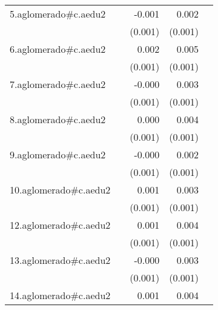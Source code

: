 {\begin{longtable}{l*{4}{D{.}{.}{-1}}}
\addlinespace
5.aglomerado#c.aedu2&                     &      -0.001         &       0.002\sym{**} &                     \\
            &                     &     (0.001)         &     (0.001)         &                     \\
\addlinespace
6.aglomerado#c.aedu2&                     &       0.002         &       0.005\sym{***}&                     \\
            &                     &     (0.001)         &     (0.001)         &                     \\
\addlinespace
7.aglomerado#c.aedu2&                     &      -0.000         &       0.003\sym{**} &                     \\
            &                     &     (0.001)         &     (0.001)         &                     \\
\addlinespace
8.aglomerado#c.aedu2&                     &       0.000         &       0.004\sym{***}&                     \\
            &                     &     (0.001)         &     (0.001)         &                     \\
\addlinespace
9.aglomerado#c.aedu2&                     &      -0.000         &       0.002\sym{**} &                     \\
            &                     &     (0.001)         &     (0.001)         &                     \\
\addlinespace
10.aglomerado#c.aedu2&                     &       0.001         &       0.003\sym{***}&                     \\
            &                     &     (0.001)         &     (0.001)         &                     \\
\addlinespace
12.aglomerado#c.aedu2&                     &       0.001         &       0.004\sym{***}&                     \\
            &                     &     (0.001)         &     (0.001)         &                     \\
\addlinespace
13.aglomerado#c.aedu2&                     &      -0.000         &       0.003\sym{***}&                     \\
            &                     &     (0.001)         &     (0.001)         &                     \\
\addlinespace
14.aglomerado#c.aedu2&                     &       0.001         &       0.004\sym{***}&                     \\

\end{longtable}}
